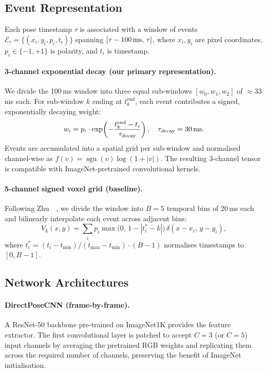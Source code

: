 \documentclass[10pt,twocolumn,letterpaper]{article}
\begin{document}
\subsection{Event Representation}
\label{sec:repr}

Each pose timestamp $\tau$ is associated with a window of events
$\mathcal{E}_\tau = \{(x_i, y_i, p_i, t_i)\}$ spanning
$[\tau - 100\text{\,ms},\,\tau]$, where $x_i,y_i$ are pixel
coordinates, $p_i\in\{-1,+1\}$ is polarity, and $t_i$ is timestamp.

\paragraph{3-channel exponential decay (our primary representation).}
We divide the 100\,ms window into three equal sub-windows
$[w_0, w_1, w_2]$ of $\approx$33\,ms each.  For sub-window $k$ ending
at $t_k^{\text{end}}$, each event contributes a signed, exponentially
decaying weight:
\begin{equation}
  w_i = p_i \cdot \exp\!\left(-\frac{t_k^{\text{end}} - t_i}{\tau_{\text{decay}}}\right),
  \quad \tau_{\text{decay}} = 30\text{\,ms}.
  \label{eq:decay}
\end{equation}
Events are accumulated into a spatial grid per sub-window and
normalised channel-wise as $f(v) = \operatorname{sgn}(v)\log(1+|v|)$.
The resulting 3-channel tensor is compatible with ImageNet-pretrained
convolutional kernels.

\paragraph{5-channel signed voxel grid (baseline).}
Following Zhu~\etal~\cite{zhu2019unsupervised}, we divide the window
into $B=5$ temporal bins of 20\,ms each and bilinearly interpolate
each event across adjacent bins:
\begin{equation}
  V_k(x, y) = \sum_i p_i \max\!\bigl(0,\, 1 - |t_i^* - k|\bigr)
               \,\delta(x{-}x_i,\, y{-}y_i),
\end{equation}
where $t_i^* = (t_i - t_{\min}) / (t_{\max} - t_{\min}) \cdot (B{-}1)$
normalises timestamps to $[0,B-1]$.

\subsection{Network Architectures}

\paragraph{DirectPoseCNN (frame-by-frame).}
\label{sec:directcnn}
A ResNet-50 \cite{he2016deep} backbone pre-trained on ImageNet1K
provides the feature extractor.  The first convolutional layer is
patched to accept $C=3$ (or $C=5$) input channels by averaging the
pretrained RGB weights and replicating them across the required number
of channels, preserving the benefit of ImageNet initialisation.
\end{document}
